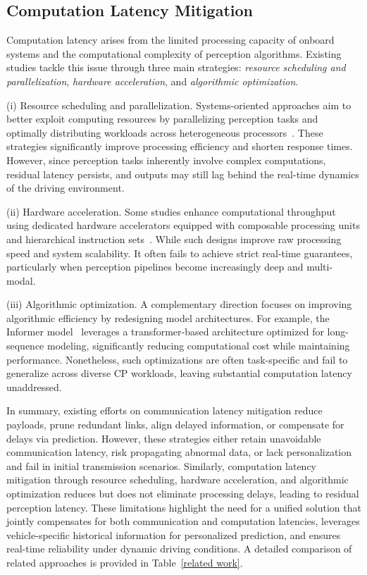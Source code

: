 \subsection{Computation Latency Mitigation}
Computation latency arises from the limited processing capacity of onboard systems and the computational complexity of perception algorithms. Existing studies tackle this issue through three main strategies: \emph{resource scheduling and parallelization}, \emph{hardware acceleration}, and \emph{algorithmic optimization}.

(i) Resource scheduling and parallelization.  
Systems-oriented approaches aim to better exploit computing resources by parallelizing perception tasks and optimally distributing workloads across heterogeneous processors~\cite{xu2024intelligent,lu2025joint}. These strategies significantly improve processing efficiency and shorten response times. However, since perception tasks inherently involve complex computations, residual latency persists, and outputs may still lag behind the real-time dynamics of the driving environment.

(ii) Hardware acceleration. 
Some studies enhance computational throughput using dedicated hardware accelerators equipped with composable processing units and hierarchical instruction sets~\cite{fan2023hardware}. While such designs improve raw processing speed and system scalability. It often fails to achieve strict real-time guarantees, particularly when perception pipelines become increasingly deep and multi-modal.

(iii) Algorithmic optimization.
A complementary direction focuses on improving algorithmic efficiency by redesigning model architectures. For example, the Informer model~\cite{zhou2021informer} leverages a transformer-based architecture optimized for long-sequence modeling, significantly reducing computational cost while maintaining performance. Nonetheless, such optimizations are often task-specific and fail to generalize across diverse CP workloads, leaving substantial computation latency unaddressed.


In summary, existing efforts on communication latency mitigation reduce payloads, prune redundant links, align delayed information, or compensate for delays via prediction. However, these strategies either retain unavoidable communication latency, risk propagating abnormal data, or lack personalization and fail in initial transmission scenarios. Similarly, computation latency mitigation through resource scheduling, hardware acceleration, and algorithmic optimization reduces but does not eliminate processing delays, leading to residual perception latency. These limitations highlight the need for a unified solution that jointly compensates for both communication and computation latencies, leverages vehicle-specific historical information for personalized prediction, and ensures real-time reliability under dynamic driving conditions. A detailed comparison of related approaches is provided in Table~\ref{related work}.





